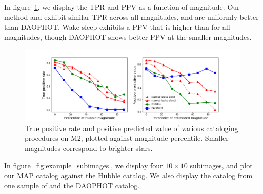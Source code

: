 

In figure~\ref{fig:summary_stats}, we display the TPR and PPV as a function of magnitude.
Our method and \cite{Feder_2019} exhibit similar TPR across all magnitudes, and are
uniformly better than DAOPHOT. Wake-sleep exhibits a PPV that is higher than \cite{Feder_2019} for all magnitudes, though DAOPHOT shows better PPV at the smaller magnitudes.

\begin{figure}[h]
    \centering
    \includegraphics[width=0.99\textwidth]{figures/summary_statistics_m2.png}
    \caption{True positive rate and positive predicted value of various cataloging
    procedures on M2, plotted against magnitude percentile.
    Smaller magnitudes correspond to brighter stars. }
    \label{fig:summary_stats}
\end{figure}

In figure~\ref{fig:example_subimages}, we display four $10\times10$ subimages, and plot
our MAP catalog against the Hubble catalog. We also display the catalog from one sample of \cite{Feder_2019} and the DAOPHOT catalog.

